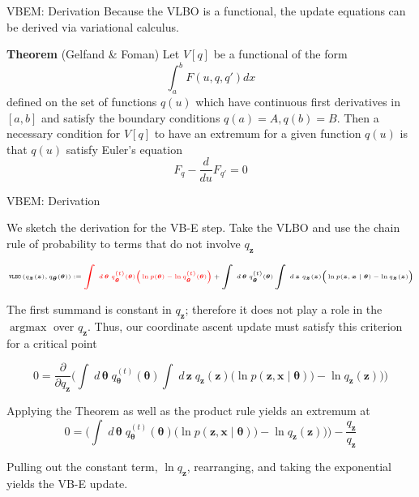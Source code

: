 \documentclass[10pt]{beamer}
\newcommand{\ds}{\displaystyle}
\newcommand{\df}{\displaystyle\frac}
\newcommand{\+}[1]{\ensuremath{{\boldsymbol #1}}} %
\newcommand{\cond}{\; | \;}
\newcommand{\red}[1]{\color{red}{#1}  \color{black}}
\DeclareMathOperator*{\argmax}{argmax} %
\newcommand{\wrt}[1]{\; d \,{#1} \;}
\newcommand{\VLBO}{\,\texttt{VLBO}\,}
\begin{document}
\begin{frame}{VBEM: Derivation}
Because the VLBO is a functional, the update equations can be derived via variational calculus.  

\textbf{Theorem} (Gelfand \& Foman)  Let $V[q]$ be a functional of the form 
\[ \ds\int_a^b F(u,q,q') dx \]
defined on the set of functions $q(u)$ which have continuous first derivatives in $[a,b]$ and satisfy the boundary conditions $q(a)=A, q(b)=B$. Then a necessary condition for $V[q]$ to have an extremum for a given function $q(u)$ is that $q(u)$ satisfy Euler's equation
\[F_q - \df{d}{du} F_{q'} =0 \]



\end{frame}

\begin{frame}{VBEM: Derivation}

We sketch the derivation for the VB-E step.  Take the VLBO and use the chain rule of probability to \red{isolate} terms that do not involve $q_\+z$

\begin{equation*}
\tiny \VLBO (q_\+z(\+z), q_\+\theta(\+\theta)):=  \red{\ds\int \wrt{\+\theta} q_\+\theta^{(t)}(\+\theta) \big( \ln p(\+\theta) - \ln q_{\+\theta}^{(t)}(\+\theta)  \big)}  + \ds\int \wrt{\+\theta}q_\+\theta^{(t)} (\+\theta) \ds\int \wrt{\+z}  q_\+z(\+z)    \big(\ln  p(\+z, \+x \cond \+\theta)  - \ln q_\+z(\+z) \big) 
\end{equation*}

The first summand is constant in $q_\+z$; therefore it does not play a role in the $\argmax$ over $q_\+z$.  Thus, our coordinate ascent update must satisfy this criterion for a critical point 

\begin{equation*}
0 =  \df{\partial}{\partial q_{\+z}} \bigg( \ds\int \wrt{\+\theta} q_\+\theta^{(t)}(\+\theta)  \ds\int \wrt{\+z}  q_\+z(\+z)    \big(\ln  p(\+z, \+x \cond \+\theta) \big) - \ln q_\+z(\+z) \big)  \bigg)
\end{equation*}

Applying the Theorem as well as the product rule yields an extremum at 
\begin{equation*}
0 =   \bigg( \ds\int \wrt{\+\theta} q_\+\theta^{(t)}(\+\theta)   \big(\ln  p(\+z, \+x \cond \+\theta) \big) - \ln q_\+z(\+z) \big) \bigg)  - \df{q_\+z}{q_\+z} 
\end{equation*}


Pulling out the constant term, $\ln q_\+z$, rearranging, and taking the  exponential yields the VB-E update. 

\end{frame}
\end{document}
